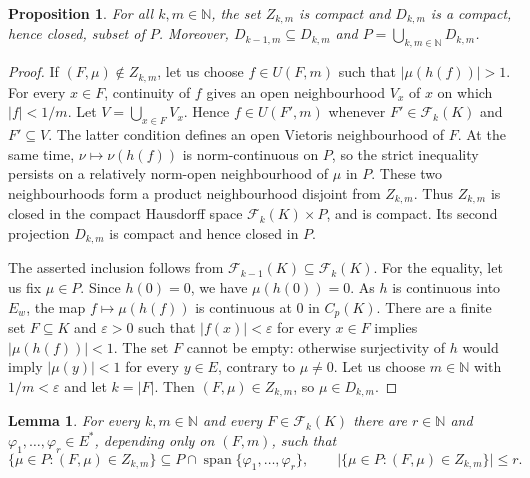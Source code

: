 \documentclass[a4paper]{amsart}
\newtheorem{proposition}[theorem]{Proposition}
\newtheorem{lemma}[theorem]{Lemma}
\newcommand{\N}{\mathbb{N}}
\newcommand{\abs}[1]{\lvert #1\rvert}
\newcommand{\Fin}{\mathcal F}
\begin{document}
\begin{proposition}\label{prop:closed-cover}
For all $k,m\in\N$, the set $Z_{k,m}$ is compact and $D_{k,m}$ is a
compact, hence closed, subset of $P$.  Moreover,
$D_{k-1,m}\subseteq D_{k,m}$ and
$P=\bigcup_{k,m\in\N}D_{k,m}$.
\end{proposition}

\begin{proof}
If $(F,\mu)\notin Z_{k,m}$, let us choose $f\in U(F,m)$ such that
$\abs{\mu(h(f))}>1$.
For every $x\in F$, continuity of $f$ gives an open neighbourhood
$V_x$ of $x$ on which $\abs f<1/m$.  Let
$V=\bigcup_{x\in F}V_x$.  Hence $f\in U(F',m)$ whenever
$F'\in\Fin_k(K)$ and $F'\subseteq V$.  The latter condition defines an
open Vietoris neighbourhood of $F$.  At the same time,
$\nu\mapsto\nu(h(f))$ is norm-continuous on $P$, so the strict inequality
persists on a relatively norm-open neighbourhood of $\mu$ in $P$.
These two neighbourhoods form a product
neighbourhood disjoint from $Z_{k,m}$.  Thus $Z_{k,m}$ is closed in the
compact Hausdorff space $\Fin_k(K)\times P$, and is compact.  Its second
projection $D_{k,m}$ is compact and hence closed in $P$.

The asserted inclusion follows from
$\Fin_{k-1}(K)\subseteq\Fin_k(K)$.  For the equality, let us fix $\mu\in P$.
Since $h(0)=0$, we have $\mu(h(0))=0$.  As $h$ is continuous into
$E_w$, the map
$f\mapsto\mu(h(f))$ is continuous at $0$ in $C_p(K)$.  There are a
finite set $F\subseteq K$
and $\varepsilon>0$ such that $\abs{f(x)}<\varepsilon$ for every
$x\in F$ implies $\abs{\mu(h(f))}<1$.
The set $F$ cannot be empty: otherwise surjectivity of $h$ would imply
$\abs{\mu(y)}<1$ for every $y\in E$, contrary to $\mu\ne0$.  Let us choose
$m\in\N$ with $1/m<\varepsilon$ and let $k=\abs F$.  Then
$(F,\mu)\in Z_{k,m}$, so $\mu\in D_{k,m}$.
\end{proof}

\begin{lemma}\label{lem:fixed-support}
For every $k,m\in\N$ and every $F\in\Fin_k(K)$ there are
$r\in\N$ and $\varphi_1,\ldots,\varphi_r\in E^*$, depending only on $(F,m)$,
such that
\[
 \{\mu\in P:(F,\mu)\in Z_{k,m}\}
 \subseteq P\cap\operatorname{span}\{\varphi_1,\ldots,\varphi_r\},
 \qquad
 \abs{\{\mu\in P:(F,\mu)\in Z_{k,m}\}}\leqslant r.
\]
\end{lemma}
\end{document}

